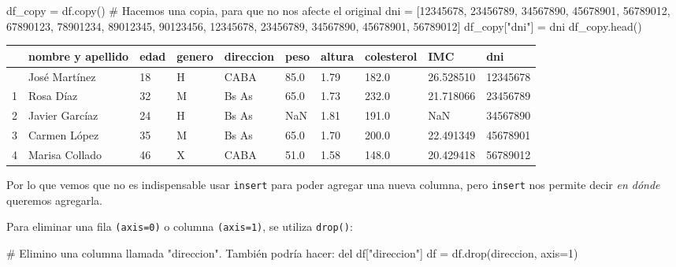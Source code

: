 \documentclass[
  letterpaper,
  DIV=11,
  numbers=noendperiod]{scrreprt}
\newenvironment{Shaded}{\begin{snugshade}}{\end{snugshade}}
\newcommand{\CommentTok}[1]{\textcolor[rgb]{0.37,0.37,0.37}{#1}}
\newcommand{\DecValTok}[1]{\textcolor[rgb]{0.68,0.00,0.00}{#1}}
\newcommand{\NormalTok}[1]{\textcolor[rgb]{0.00,0.23,0.31}{#1}}
\newcommand{\OperatorTok}[1]{\textcolor[rgb]{0.37,0.37,0.37}{#1}}
\newcommand{\StringTok}[1]{\textcolor[rgb]{0.13,0.47,0.30}{#1}}
\begin{document}
\begin{Shaded}
\begin{Highlighting}[]
\NormalTok{df\_copy }\OperatorTok{=}\NormalTok{ df.copy() }\CommentTok{\# Hacemos una copia, para que no nos afecte el original}
\NormalTok{dni }\OperatorTok{=}\NormalTok{ [}\DecValTok{12345678}\NormalTok{, }\DecValTok{23456789}\NormalTok{, }\DecValTok{34567890}\NormalTok{, }\DecValTok{45678901}\NormalTok{, }\DecValTok{56789012}\NormalTok{, }\DecValTok{67890123}\NormalTok{, }\DecValTok{78901234}\NormalTok{, }\DecValTok{89012345}\NormalTok{, }\DecValTok{90123456}\NormalTok{, }\DecValTok{12345678}\NormalTok{, }\DecValTok{23456789}\NormalTok{, }\DecValTok{34567890}\NormalTok{, }\DecValTok{45678901}\NormalTok{, }\DecValTok{56789012}\NormalTok{]}
\NormalTok{df\_copy[}\StringTok{"dni"}\NormalTok{] }\OperatorTok{=}\NormalTok{ dni}
\NormalTok{df\_copy.head()}
\end{Highlighting}
\end{Shaded}

\begin{longtable}[]{@{}llllllllll@{}}
\toprule\noalign{}
& nombre y apellido & edad & genero & direccion & peso & altura &
colesterol & IMC & dni \\
\midrule\noalign{}
\endhead
\bottomrule\noalign{}
\endlastfoot
0 & José Martínez & 18 & H & CABA & 85.0 & 1.79 & 182.0 & 26.528510 &
12345678 \\
1 & Rosa Díaz & 32 & M & Bs As & 65.0 & 1.73 & 232.0 & 21.718066 &
23456789 \\
2 & Javier Garcíaz & 24 & H & Bs As & NaN & 1.81 & 191.0 & NaN &
34567890 \\
3 & Carmen López & 35 & M & Bs As & 65.0 & 1.70 & 200.0 & 22.491349 &
45678901 \\
4 & Marisa Collado & 46 & X & CABA & 51.0 & 1.58 & 148.0 & 20.429418 &
56789012 \\
\end{longtable}

Por lo que vemos que no es indispensable usar \texttt{insert} para poder
agregar una nueva columna, pero \texttt{insert} nos permite decir
\emph{en dónde} queremos agregarla.

Para eliminar una fila \texttt{(axis=0)} o columna \texttt{(axis=1)}, se
utiliza \texttt{drop()}:

\begin{Shaded}
\begin{Highlighting}[]
\CommentTok{\# Elimino una columna llamada "direccion". También podría hacer: \textasciigrave{}del df["direccion"]\textasciigrave{}}
\NormalTok{df }\OperatorTok{=}\NormalTok{ df.drop(}\StringTok{\textquotesingle{}direccion\textquotesingle{}}\NormalTok{, axis}\OperatorTok{=}\DecValTok{1}\NormalTok{)  }
\end{Highlighting}
\end{Shaded}
\end{document}
